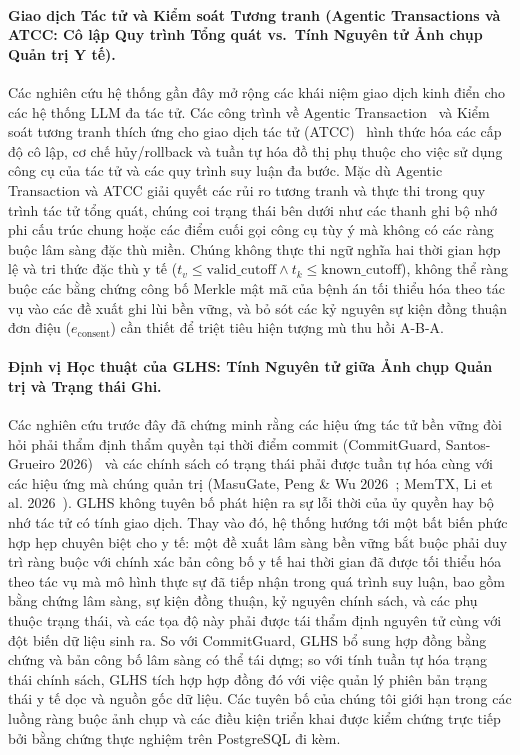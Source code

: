 \documentclass[11pt]{article}
\begin{document}
\paragraph{Giao dịch Tác tử và Kiểm soát Tương tranh (Agentic Transactions và ATCC: Cô lập Quy trình Tổng quát vs.\ Tính Nguyên tử Ảnh chụp Quản trị Y tế).}
Các nghiên cứu hệ thống gần đây mở rộng các khái niệm giao dịch kinh điển cho các hệ thống LLM đa tác tử. Các công trình về Agentic Transaction~\cite{agentictransaction2026} và Kiểm soát tương tranh thích ứng cho giao dịch tác tử (ATCC)~\cite{atcc2026} hình thức hóa các cấp độ cô lập, cơ chế hủy/rollback và tuần tự hóa đồ thị phụ thuộc cho việc sử dụng công cụ của tác tử và các quy trình suy luận đa bước. Mặc dù Agentic Transaction và ATCC giải quyết các rủi ro tương tranh và thực thi trong quy trình tác tử tổng quát, chúng coi trạng thái bên dưới như các thanh ghi bộ nhớ phi cấu trúc chung hoặc các điểm cuối gọi công cụ tùy ý mà không có các ràng buộc lâm sàng đặc thù miền. Chúng không thực thi ngữ nghĩa hai thời gian hợp lệ và tri thức đặc thù y tế ($t_v \le \text{valid\_cutoff} \land t_k \le \text{known\_cutoff}$), không thể ràng buộc các bằng chứng công bố Merkle mật mã của bệnh án tối thiểu hóa theo tác vụ vào các đề xuất ghi lùi bền vững, và bỏ sót các kỷ nguyên sự kiện đồng thuận đơn điệu ($e_{\text{consent}}$) cần thiết để triệt tiêu hiện tượng mù thu hồi A-B-A.

\paragraph{Định vị Học thuật của GLHS: Tính Nguyên tử giữa Ảnh chụp Quản trị và Trạng thái Ghi.}
Các nghiên cứu trước đây đã chứng minh rằng các hiệu ứng tác tử bền vững đòi hỏi phải thẩm định thẩm quyền tại thời điểm commit (CommitGuard, Santos-Grueiro 2026)~\cite{temporaryauth} và các chính sách có trạng thái phải được tuần tự hóa cùng với các hiệu ứng mà chúng quản trị (MasuGate, Peng \& Wu 2026~\cite{statefulgov}; MemTX, Li et al. 2026~\cite{memtx}). GLHS không tuyên bố phát hiện ra sự lỗi thời của ủy quyền hay bộ nhớ tác tử có tính giao dịch. Thay vào đó, hệ thống hướng tới một bất biến phức hợp hẹp chuyên biệt cho y tế: một đề xuất lâm sàng bền vững bắt buộc phải duy trì ràng buộc với chính xác bản công bố y tế hai thời gian đã được tối thiểu hóa theo tác vụ mà mô hình thực sự đã tiếp nhận trong quá trình suy luận, bao gồm bằng chứng lâm sàng, sự kiện đồng thuận, kỷ nguyên chính sách, và các phụ thuộc trạng thái, và các tọa độ này phải được tái thẩm định nguyên tử cùng với đột biến dữ liệu sinh ra. So với CommitGuard, GLHS bổ sung hợp đồng bằng chứng và bản công bố lâm sàng có thể tái dựng; so với tính tuần tự hóa trạng thái chính sách, GLHS tích hợp hợp đồng đó với việc quản lý phiên bản trạng thái y tế dọc và nguồn gốc dữ liệu. Các tuyên bố của chúng tôi giới hạn trong các luồng ràng buộc ảnh chụp và các điều kiện triển khai được kiểm chứng trực tiếp bởi bằng chứng thực nghiệm trên PostgreSQL đi kèm.
\end{document}
